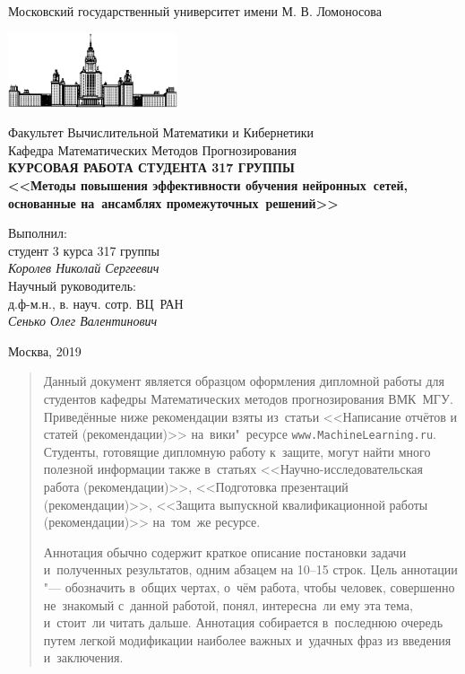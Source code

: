\documentclass[12pt, fleqn]{article}
\begin{document}
\begin{titlepage}
\begin{center}
    Московский государственный университет имени М. В. Ломоносова

    \bigskip
    \includegraphics[width=50mm]{msu.eps}

    \bigskip
    Факультет Вычислительной Математики и Кибернетики\\
    Кафедра Математических Методов Прогнозирования\\[10mm]

    \textsf{\large\bfseries
        КУРСОВАЯ РАБОТА СТУДЕНТА 317 ГРУППЫ\\[10mm]
        <<Методы повышения эффективности обучения нейронных~сетей, основанные на~ансамблях промежуточных~решений>>
    }\\[10mm]

    \begin{flushright}
        \parbox{0.5\textwidth}{
            Выполнил:\\
            студент 3 курса 317 группы\\
            \emph{Королев Николай Сергеевич}\\[5mm]
            Научный руководитель:\\
            д.ф-м.н., в. науч. сотр. ВЦ~РАН\\
            \emph{Сенько Олег Валентинович}
        }
    \end{flushright}

    \vspace{\fill}
    Москва, 2019
\end{center}
\end{titlepage}

\newpage
\renewcommand{\contentsname}{Содержание}
\tableofcontents

\newpage
\begin{abstract}
    Данный документ является образцом оформления дипломной работы для студентов кафедры 
    Математических методов прогнозирования ВМК~МГУ. 
    Приведённые ниже рекомендации взяты из~статьи
    <<Написание отчётов и статей (рекомендации)>>
    на~вики"~ресурсе \texttt{www.MachineLearning.ru}.
    Студенты, готовящие дипломную работу к~защите, 
    могут найти много полезной информации также в~статьях 
    <<Научно-исследовательская работа (рекомендации)>>,
    <<Подготовка презентаций (рекомендации)>>,
    <<Защита выпускной квалификационной работы (рекомендации)>>
    на~том~же ресурсе. 

    Аннотация обычно содержит 
    краткое описание постановки задачи и~полученных результатов,
    одним абзацем на 10--15 строк.
    Цель аннотации "--- обозначить в~общих чертах, о~чём работа,
    чтобы человек, совершенно не~знакомый с~данной работой,
    понял, интересна~ли ему эта тема, и~стоит~ли читать дальше.
    Аннотация собирается в~последнюю очередь
    путем легкой модификации наиболее важных и~удачных фраз из введения и~заключения.
\end{abstract}
\end{document}
